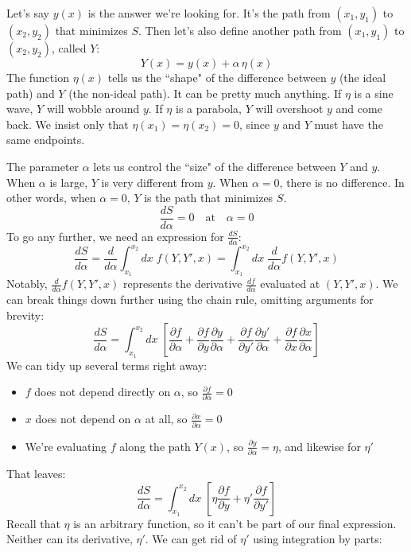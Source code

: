 \documentclass[10pt]{article}
\begin{document}
Let's say $y(x)$ is the answer we're looking for. It's the path from $\left( x_1, y_1 \right)$ to $\left( x_2, y_2 \right)$ that minimizes $S$. Then let's also define another path from $\left( x_1, y_1 \right)$ to $\left( x_2, y_2 \right)$, called $Y$:
$$
Y(x) = y(x) + \alpha \, \eta(x)
$$
The function $\eta(x)$ tells us the ``shape" of the difference between $y$ (the ideal path) and $Y$ (the non-ideal path). It can be pretty much anything. If $\eta$ is a sine wave, $Y$ will wobble around $y$. If $\eta$ is a parabola, $Y$ will overshoot $y$ and come back. We insist only that $\eta(x_1)=\eta(x_2)=0$, since $y$ and $Y$ must have the same endpoints.

The parameter $\alpha$ lets us control the ``size" of the difference between $Y$ and $y$. When $\alpha$ is large, $Y$ is very different from $y$. When $\alpha=0$, there is no difference. In other words, when $\alpha=0$, $Y$ is the path that minimizes $S$.
$$
\frac{dS}{d\alpha} =0 \quad \textrm{at} \quad \alpha=0
$$
To go any further, we need an expression for $\frac{dS}{d\alpha}$:
$$
\frac{dS}{d\alpha} =
\frac{d}{d\alpha} \displaystyle\int_{x_1}^{x_2} dx \; f(Y, Y', x) =
\displaystyle\int_{x_1}^{x_2} dx \; \frac{d}{d\alpha} f(Y, Y', x)
$$
Notably, $\frac{d}{d\alpha} f(Y, Y', x)$ represents the derivative $\frac{df}{d\alpha}$ evaluated at $(Y, Y', x)$. We can break things down further using the chain rule, omitting arguments for brevity: 
$$
\frac{dS}{d\alpha} = \displaystyle\int_{x_1}^{x_2} dx \; \left[
    \frac{\partial f}{\partial \alpha} +
    \frac{\partial f}{\partial y} \frac{\partial y}{\partial \alpha} +
    \frac{\partial f}{\partial y'} \frac{\partial y'}{\partial \alpha} +
    \frac{\partial f}{\partial x} \frac{\partial x}{\partial \alpha}
\right]
$$
We can tidy up several terms right away:
\begin{itemize}
    \item $f$ does not depend directly on $\alpha$, so $\frac{\partial f}{\partial \alpha} = 0$
    \item $x$ does not depend on $\alpha$ at all, so $\frac{\partial x}{\partial \alpha} = 0$
    \item We're evaluating $f$ along the path $Y(x)$, so $\frac{\partial y}{\partial \alpha} = \eta$, and likewise for $\eta'$
\end{itemize}
That leaves:
$$
\frac{dS}{d\alpha} = \displaystyle\int_{x_1}^{x_2} dx \; \left[ \eta \frac{\partial f}{\partial y} + \eta' \frac{\partial f}{\partial y'} \right]
$$
Recall that $\eta$ is an arbitrary function, so it can't be part of our final expression. Neither can its derivative, $\eta'$. We can get rid of $\eta'$ using integration by parts:
\end{document}
